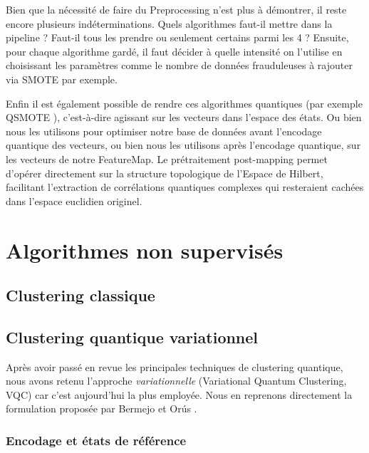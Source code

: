 \documentclass[a4paper]{article}
\begin{document}
Bien que la nécessité de faire du Preprocessing n'est plus à démontrer, il reste encore plusieurs indéterminations. Quels algorithmes faut-il mettre dans la pipeline ? Faut-il tous les prendre ou seulement certains parmi les 4 ? Ensuite, pour chaque algorithme gardé, il faut décider à quelle intensité on l'utilise en choisissant les paramètres comme le nombre de données frauduleuses à rajouter via SMOTE par exemple. 

Enfin il est également possible de rendre ces algorithmes quantiques (par exemple QSMOTE \cite{SMOTE2025}), c'est-à-dire agissant sur les vecteurs dans l'espace des états. Ou bien nous les utilisons pour optimiser notre base de données avant l'encodage quantique des vecteurs, ou bien nous les utilisons après l'encodage quantique, sur les vecteurs de notre FeatureMap. Le prétraitement post-mapping permet d'opérer directement sur la structure topologique de l'Espace de Hilbert, facilitant l'extraction de corrélations quantiques complexes qui resteraient cachées dans l'espace euclidien originel. 

\section{Algorithmes non supervisés}\label{sec:clustering}

\subsection{Clustering classique}

\subsection{Clustering quantique variationnel}
\label{subsec:vqc-clustering}

Après avoir passé en revue les principales techniques de clustering quantique, nous avons retenu l'approche \emph{variationnelle} (Variational Quantum Clustering, VQC) car c'est aujourd'hui la plus employée. Nous en reprenons directement la formulation proposée par Bermejo et Orús \cite{bermejo_orus}.

\subsubsection*{Encodage et états de référence}
\end{document}
